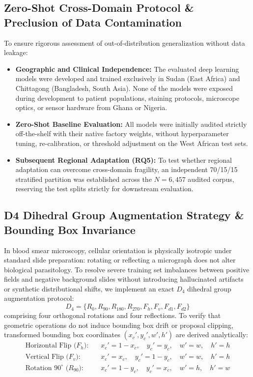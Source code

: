 \documentclass[a4paper,11pt]{article}
\begin{document}
\subsection{Zero-Shot Cross-Domain Protocol \& Preclusion of Data Contamination}
To ensure rigorous assessment of out-of-distribution generalization without data leakage:
\begin{itemize}
    \item \textbf{Geographic and Clinical Independence:} The evaluated deep learning models were developed and trained exclusively in Sudan (East Africa) and Chittagong (Bangladesh, South Asia). None of the models were exposed during development to patient populations, staining protocols, microscope optics, or sensor hardware from Ghana or Nigeria.
    \item \textbf{Zero-Shot Baseline Evaluation:} All models were initially audited strictly off-the-shelf with their native factory weights, without hyperparameter tuning, re-calibration, or threshold adjustment on the West African test sets.
    \item \textbf{Subsequent Regional Adaptation (RQ5):} To test whether regional adaptation can overcome cross-domain fragility, an independent 70/15/15 stratified partition was established across the $N = 6,457$ audited corpus, reserving the test splits strictly for downstream evaluation.
\end{itemize}

\subsection{D4 Dihedral Group Augmentation Strategy \& Bounding Box Invariance}
In blood smear microscopy, cellular orientation is physically isotropic under standard slide preparation: rotating or reflecting a micrograph does not alter biological parasitology. To resolve severe training set imbalances between positive fields and negative background slides without introducing hallucinated artifacts or synthetic distributional shifts, we implement an exact $D_4$ dihedral group augmentation protocol:
\begin{equation}
D_4 = \{R_0, R_{90}, R_{180}, R_{270}, F_h, F_v, F_{d1}, F_{d2}\}
\end{equation}
comprising four orthogonal rotations and four reflections. To verify that geometric operations do not induce bounding box drift or proposal clipping, transformed bounding box coordinates $(x_c', y_c', w', h')$ are derived analytically:
\begin{align}
\text{Horizontal Flip ($F_h$):} & \quad x_c' = 1 - x_c, \quad y_c' = y_c, \quad w' = w, \quad h' = h \\
\text{Vertical Flip ($F_v$):}   & \quad x_c' = x_c, \quad y_c' = 1 - y_c, \quad w' = w, \quad h' = h \\
\text{Rotation $90^\circ$ ($R_{90}$):} & \quad x_c' = 1 - y_c, \quad y_c' = x_c, \quad w' = h, \quad h' = w
\end{align}
\end{document}
